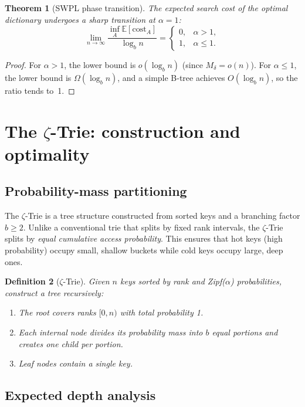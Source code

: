\documentclass[preprint,12pt,authoryear]{elsarticle}
\newtheorem{theorem}{Theorem}[section]
\newtheorem{definition}[theorem]{Definition}
\newcommand{\E}{\mathbb{E}}
\begin{document}
\begin{theorem}[SWPL phase transition]
\label{thm:phase}
The expected search cost of the optimal dictionary undergoes a
sharp transition at $\alpha = 1$:
\[
\lim_{n\to\infty} \frac{ \inf_{A} \E[\text{cost}_A] }{\log_b n}
=
\begin{cases}
0, & \alpha > 1,\\
1, & \alpha \le 1.
\end{cases}
\]
\end{theorem}

\begin{proof}
For $\alpha > 1$, the lower bound is $o(\log_b n)$ (since
$M_\delta = o(n)$).  For $\alpha \le 1$, the lower bound is
$\Omega(\log_b n)$, and a simple B-tree achieves $O(\log_b n)$,
so the ratio tends to~1.
\end{proof}

\section{The $\zeta$-Trie: construction and optimality}

\subsection{Probability-mass partitioning}

The $\zeta$-Trie is a tree structure constructed from sorted keys and
a branching factor $b \ge 2$.  Unlike a conventional trie that splits
by fixed rank intervals, the $\zeta$-Trie splits by \emph{equal
cumulative access probability}.  This ensures that hot keys (high
probability) occupy small, shallow buckets while cold keys occupy
large, deep ones.

\begin{definition}[$\zeta$-Trie]
Given $n$ keys sorted by rank and Zipf($\alpha$) probabilities,
construct a tree recursively:
\begin{enumerate}
  \item The root covers ranks $[0, n)$ with total probability 1.
  \item Each internal node divides its probability mass into $b$
        equal portions and creates one child per portion.
  \item Leaf nodes contain a single key.
\end{enumerate}
\end{definition}

\subsection{Expected depth analysis}
\end{document}
